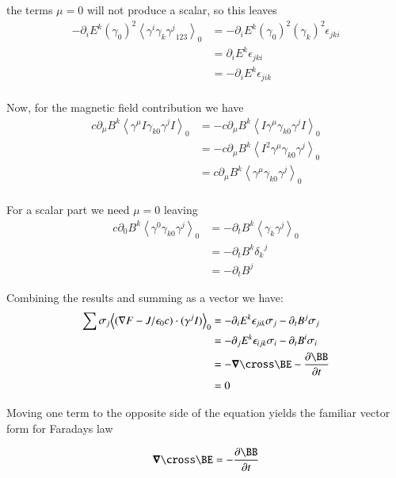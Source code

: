 \documentclass{article}      %
\newcommand{\gpgrade}[2] {{\left\langle{{#1}}\right\rangle}_{#2}}
\newcommand{\gpgradezero}[1] {\gpgrade{#1}{0}}
\newcommand{\grad}[0]{\nabla}
\newcommand{\spacegrad}[0]{\boldsymbol{\nabla}}
\newcommand{\PD}[2]{\frac{\partial {#2}}{\partial {#1}}}
\begin{document}
the terms $\mu = 0$ will not produce a scalar, so this leaves
\begin{align*}
-\partial_{i} E^k (\gamma_0)^2 \gpgradezero{ \gamma^{i} \gamma_{k} {\gamma^j}_{123} }
&= -\partial_{i} E^k (\gamma_0)^2 (\gamma_k)^2 \epsilon_{jki} \\
&= \partial_{i} E^k \epsilon_{j k i} \\
&= -\partial_{i} E^k \epsilon_{jik} \\
\end{align*}

Now, for the magnetic field contribution we have
\begin{align*}
c \partial_{\mu} B^k \gpgradezero{ \gamma^{\mu} I \gamma_{k0} {\gamma^j} I } 
&= - c \partial_{\mu} B^k \gpgradezero{ I \gamma^{\mu} \gamma_{k0} {\gamma^j} I } \\
&= - c \partial_{\mu} B^k \gpgradezero{ I^2 \gamma^{\mu} \gamma_{k0} {\gamma^j} } \\
&= c \partial_{\mu} B^k \gpgradezero{ \gamma^{\mu} \gamma_{k0} {\gamma^j} } \\
\end{align*}

For a scalar part we need $\mu = 0$ leaving
\begin{align*}
c \partial_{0} B^k \gpgradezero{ \gamma^{0} \gamma_{k0} {\gamma^j} } 
&= -\partial_{t} B^k \gpgradezero{ \gamma_{k} {\gamma^j} } \\
&= -\partial_{t} B^k {\delta_{k}}^j \\
&= -\partial_{t} B^j
\end{align*}

Combining the results and summing as a vector we have:
\begin{align*}
\sum \sigma_j \gpgradezero{( \grad F - J/\epsilon_0 c ) \cdot (\gamma^j I)}
&= -\partial_{i} E^k \epsilon_{jik} \sigma_j -\partial_{t} B^j \sigma_j \\
&= -\partial_{j} E^k \epsilon_{i j k} \sigma_i -\partial_{t} B^i \sigma_i \\
&= -\spacegrad \cross \BE - \PD{t}{\BB} \\
&= 0
\end{align*}

Moving one term to the opposite side of the equation yields the familiar vector form for Faradays law

\begin{equation}
\spacegrad \cross \BE = -\PD{t}{\BB}
\end{equation}
\end{document}
